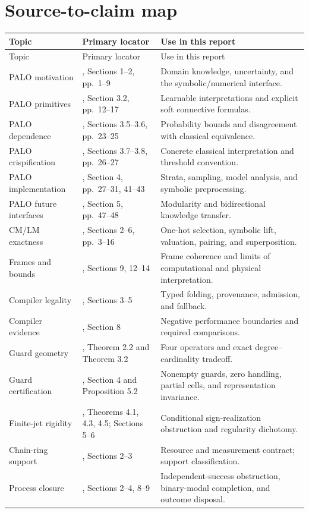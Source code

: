 \documentclass[11pt,a4paper]{article}
\theoremstyle{remark}
\begin{document}
\section{Source-to-claim map}
\small
\begin{longtable}{@{}P{29mm}P{48mm}P{60mm}@{}}
\toprule
Topic & Primary locator & Use in this report\\
\midrule
\endfirsthead
\toprule Topic & Primary locator & Use in this report\\\midrule
\endhead
PALO motivation & \cite{palo}, Sections 1--2, pp.~1--9 & Domain knowledge, uncertainty, and the symbolic/numerical interface.\\
PALO primitives & \cite{palo}, Section 3.2, pp.~12--17 & Learnable interpretations and explicit soft connective formulas.\\
PALO dependence & \cite{palo}, Sections 3.5--3.6, pp.~23--25 & Probability bounds and disagreement with classical equivalence.\\
PALO crispification & \cite{palo}, Sections 3.7--3.8, pp.~26--27 & Concrete classical interpretation and threshold convention.\\
PALO implementation & \cite{palo}, Section 4, pp.~27--31, 41--43 & Strata, sampling, model analysis, and symbolic preprocessing.\\
PALO future interfaces & \cite{palo}, Section 5, pp.~47--48 & Modularity and bidirectional knowledge transfer.\\
CM/LM exactness & \cite{lm}, Sections 2--6, pp.~3--16 & One-hot selection, symbolic lift, valuation, pairing, and superposition.\\
Frames and bounds & \cite{lm}, Sections 9, 12--14 & Frame coherence and limits of computational and physical interpretation.\\
Compiler legality & \cite{compiler}, Sections 3--5 & Typed folding, provenance, admission, and fallback.\\
Compiler evidence & \cite{compiler}, Section 8 & Negative performance boundaries and required comparisons.\\
Guard geometry & \cite{guard}, Theorem 2.2 and Theorem 3.2 & Four operators and exact degree--cardinality tradeoff.\\
Guard certification & \cite{guard}, Section 4 and Proposition 5.2 & Nonempty guards, zero handling, partial cells, and representation invariance.\\
Finite-jet rigidity & \cite{jet}, Theorems 4.1, 4.3, 4.5; Sections 5--6 & Conditional sign-realization obstruction and regularity dichotomy.\\
Chain-ring support & \cite{context}, Sections 2--3 & Resource and measurement contract; support classification.\\
Process closure & \cite{process}, Sections 2--4, 8--9 & Independent-success obstruction, binary-modal completion, and outcome disposal.\\
\bottomrule
\end{longtable}
\normalsize
\end{document}
